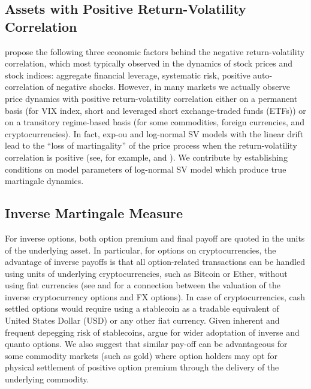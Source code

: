\documentclass[11pt,a4paper] {article}
\begin{document}
\subsection{Assets with Positive Return-Volatility Correlation}

\cite{CarrWu} propose the following three economic factors behind the negative return-volatility correlation, which most typically observed in the dynamics of stock prices and stock indices: aggregate financial leverage, systematic risk, positive auto-correlation of negative shocks. However, in many markets we actually observe price dynamics with positive return-volatility correlation either on a permanent basis (for VIX index, short and leveraged short exchange-traded funds (ETFs)) or on a transitory regime-based basis (for some commodities, foreign currencies, and cryptocurrencies). In fact, exp-ou and log-normal SV models with the linear drift lead to the ``loss of martingality'' of the price process when the return-volatility correlation is positive (see, for example, \cite{Lewis2000, Lewis2019} and \cite{Lions2007}). We contribute by establishing conditions on model parameters of log-normal SV model which produce true martingale dynamics. 



\subsection{Inverse Martingale Measure}

For inverse options, both option premium and final payoff are quoted in the units of the underlying asset. In particular, for options on cryptocurrencies, the advantage of inverse payoffs is that all option-related transactions can be handled using units of underlying cryptocurrencies, such as Bitcoin or Ether, without using fiat currencies (see \cite{Lucic2022} and \cite{LucicSepp2023} for a connection between the valuation of the inverse cryptocurrency options and FX options). In case of cryptocurrencies, cash settled options would require using a stablecoin as a tradable equivalent of United States Dollar (USD) or any other fiat currency. Given inherent and frequent depegging risk of stablecoins, \cite{Alexander2022} argue for wider adoptation of inverse and quanto options. We also suggest that similar pay-off can be advantageous for some commodity markets (such as gold) where option holders may opt for physical settlement of positive option premium through the delivery of the underlying commodity. 
\end{document}
